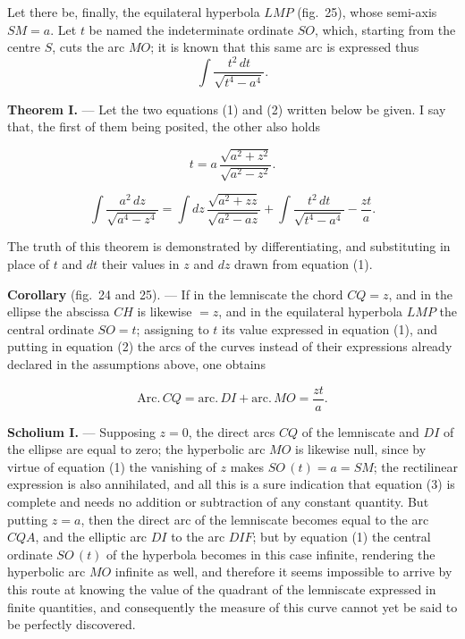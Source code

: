 \documentclass{article}
\begin{document}

Let there be, finally, the equilateral hyperbola $LMP$ (fig.~25), whose semi-axis $SM = a$. Let
$t$ be named the indeterminate ordinate $SO$, which, starting from the centre $S$, cuts the arc
$MO$; it is known that this same arc is expressed thus
\[ \int \frac{t^{2}\,dt}{\sqrt{t^{4} - a^{4}}}. \]


\textbf{Theorem I.} --- Let the two equations (1) and (2) written below be given. I say that,
the first of them being posited, the other also holds

\[ t = a\, \frac{\sqrt{a^{2} + z^{2}}}{\sqrt{a^{2} - z^{2}}}. \tag{1} \]

\[ \int \frac{a^{2}\,dz}{\sqrt{a^{4} - z^{4}}} = \int dz\, \frac{\sqrt{a^{2} + zz}}{\sqrt{a^{2} - az}} + \int \frac{t^{2}\,dt}{\sqrt{t^{4} - a^{4}}} - \frac{zt}{a}. \tag{2} \]

The truth of this theorem is demonstrated by differentiating, and substituting in place of $t$
and $dt$ their values in $z$ and $dz$ drawn from equation (1).

\textbf{Corollary} (fig.~24 and 25). --- If in the lemniscate the chord $CQ = z$, and in the
ellipse the abscissa $CH$ is likewise $= z$, and in the equilateral hyperbola $LMP$ the central
ordinate $SO = t$; assigning to $t$ its value expressed in equation (1), and putting in
equation (2) the arcs of the curves instead of their expressions already declared in the
assumptions above, one obtains

\[ \mathrm{Arc.}\,CQ = \mathrm{arc.}\,DI + \mathrm{arc.}\,MO = \frac{zt}{a}. \tag{3} \]

\textbf{Scholium I.} --- Supposing $z = 0$, the direct arcs $CQ$ of the lemniscate and $DI$ of
the ellipse are equal to zero; the hyperbolic arc $MO$ is likewise null, since by virtue of
equation (1) the vanishing of $z$ makes $SO\,(t) = a = SM$; the rectilinear expression is also
annihilated, and all this is a sure indication that equation (3) is complete and needs no
addition or subtraction of any constant quantity. But putting $z = a$, then the direct arc of
the lemniscate becomes equal to the arc $CQA$, and the elliptic arc $DI$ to the arc $DIF$; but
by equation (1) the central ordinate $SO\,(t)$ of the hyperbola becomes in this case infinite,
rendering the hyperbolic arc $MO$ infinite as well, and therefore it seems impossible to arrive
by this route at knowing the
value of the quadrant of the lemniscate expressed in finite quantities, and consequently the
measure of this curve cannot yet be said to be perfectly discovered.
\end{document}
